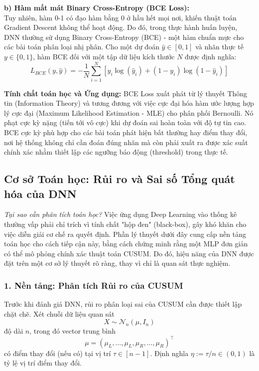 \textbf{b) Hàm mất mát Binary Cross-Entropy (BCE Loss):} \\
Tuy nhiên, hàm 0-1 có đạo hàm bằng 0 ở hầu hết mọi nơi, khiến thuật toán Gradient Descent không thể hoạt động. Do đó, trong thực hành huấn luyện, DNN thường sử dụng Binary Cross-Entropy (BCE) - một hàm chuẩn mực cho các bài toán phân loại nhị phân. Cho một dự đoán $\hat{y} \in [0, 1]$ và nhãn thực tế $y \in \{0, 1\}$, hàm BCE đối với một tập dữ liệu kích thước $N$ được định nghĩa:
\begin{equation}
    L_{BCE}(y, \hat{y}) = - \frac{1}{N} \sum_{i=1}^N \left[ y_i \log(\hat{y}_i) + (1 - y_i) \log(1 - \hat{y}_i) \right]
\end{equation}

\textbf{Tính chất toán học và Ứng dụng:} BCE Loss xuất phát từ lý thuyết Thông tin (Information Theory) và tương đương với việc cực đại hóa hàm ước lượng hợp lý cực đại (Maximum Likelihood Estimation - MLE) cho phân phối Bernoulli. Nó phạt cực kỳ nặng (tiến tới vô cực) khi dự đoán sai hoàn toàn với độ tự tin cao. BCE cực kỳ phù hợp cho các bài toán phát hiện bất thường hay điểm thay đổi, nơi hệ thống không chỉ cần đoán đúng nhãn mà còn phải xuất ra được xác suất chính xác nhằm thiết lập các ngưỡng báo động (threshold) trong thực tế.

\subsection{Cơ sở Toán học: Rủi ro và Sai số Tổng quát hóa của DNN}

\textit{Tại sao cần phân tích toán học?} Việc ứng dụng Deep Learning vào thống kê thường vấp phải chỉ trích vì tính chất "hộp đen" (black-box), gây khó khăn cho việc diễn giải cơ chế ra quyết định. Phần lý thuyết dưới đây cung cấp nền tảng toán học cho cách tiếp cận này, bằng cách chứng minh rằng một MLP đơn giản có thể mô phỏng chính xác thuật toán CUSUM. Do đó, hiệu năng của DNN được đặt trên một cơ sở lý thuyết rõ ràng, thay vì chỉ là quan sát thực nghiệm.

\subsubsection*{1. Nền tảng: Phân tích Rủi ro của CUSUM}
Trước khi đánh giá DNN, rủi ro phân loại sai của CUSUM cần được thiết lập chặt chẽ. Xét chuỗi dữ liệu quan sát
\[
    X \sim \mathcal{N}_n(\mu, I_n)
\]
độ dài $n$, trong đó vector trung bình
\[
    \mu = (\mu_L, \dots, \mu_L, \mu_R, \dots, \mu_R)^\top
\]
có điểm thay đổi (nếu có) tại vị trí $\tau \in [n-1]$. Định nghĩa $\eta := \tau/n \in (0, 1)$ là tỷ lệ vị trí điểm thay đổi.


